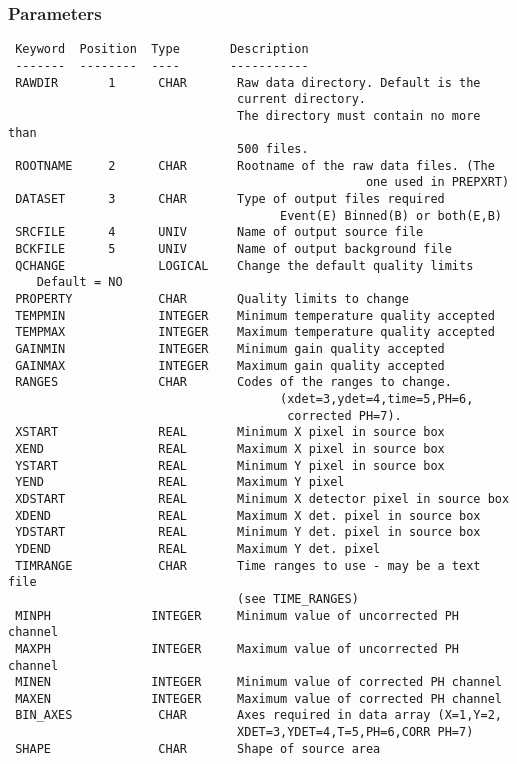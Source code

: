 \documentclass{book}
\renewcommand{\_}{{\tt\char'137}}     %
\begin{document}
\subsubsection{Parameters}
\begin{verbatim}
 Keyword  Position  Type       Description
 -------  --------  ----       -----------
 RAWDIR       1      CHAR       Raw data directory. Default is the
                                current directory.
                                The directory must contain no more than
                                500 files.
 ROOTNAME     2      CHAR       Rootname of the raw data files. (The
                                                  one used in PREPXRT)
 DATASET      3      CHAR       Type of output files required
                                      Event(E) Binned(B) or both(E,B)
 SRCFILE      4      UNIV       Name of output source file
 BCKFILE      5      UNIV       Name of output background file
 QCHANGE             LOGICAL    Change the default quality limits
    Default = NO
 PROPERTY            CHAR       Quality limits to change
 TEMPMIN             INTEGER    Minimum temperature quality accepted
 TEMPMAX             INTEGER    Maximum temperature quality accepted
 GAINMIN             INTEGER    Minimum gain quality accepted
 GAINMAX             INTEGER    Maximum gain quality accepted
 RANGES              CHAR       Codes of the ranges to change.
                                      (xdet=3,ydet=4,time=5,PH=6,
                                       corrected PH=7).
 XSTART              REAL       Minimum X pixel in source box
 XEND                REAL       Maximum X pixel in source box
 YSTART              REAL       Minimum Y pixel in source box
 YEND                REAL       Maximum Y pixel
 XDSTART             REAL       Minimum X detector pixel in source box
 XDEND               REAL       Maximum X det. pixel in source box
 YDSTART             REAL       Minimum Y det. pixel in source box
 YDEND               REAL       Maximum Y det. pixel
 TIMRANGE            CHAR       Time ranges to use - may be a text file
                                (see TIME_RANGES)
 MINPH              INTEGER     Minimum value of uncorrected PH channel
 MAXPH              INTEGER     Maximum value of uncorrected PH channel
 MINEN              INTEGER     Minimum value of corrected PH channel
 MAXEN              INTEGER     Maximum value of corrected PH channel
 BIN_AXES            CHAR       Axes required in data array (X=1,Y=2,
                                XDET=3,YDET=4,T=5,PH=6,CORR PH=7)
 SHAPE               CHAR       Shape of source area

\end{verbatim}
\end{document}
